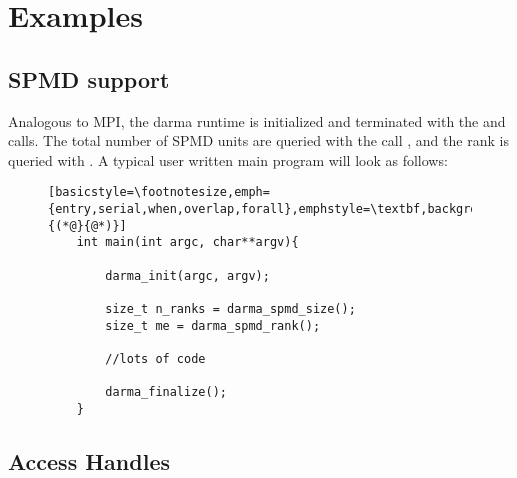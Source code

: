 \chapter{Examples}
\label{chap:examples}


\section{SPMD support}

Analogous to MPI, the darma runtime is initialized and terminated with the  
and  calls. The total number of SPMD units are queried with the call , 
and the rank is queried with . A typical user written main program will look as follows:

\begin{figure}[h!]
\begin{lstlisting}[basicstyle=\footnotesize,emph={entry,serial,when,overlap,forall},emphstyle=\textbf,backgroundcolor=\color{grayish},framexleftmargin=1em,numbers=left,numberstyle=\tiny,numbersep=5pt,escapeinside={(*@}{@*)}]
	int main(int argc, char**argv){

		darma_init(argc, argv);

		size_t n_ranks = darma_spmd_size();
		size_t me = darma_spmd_rank();

		//lots of code

		darma_finalize();
	}
\end{lstlisting}
\end{figure}


\section{Access Handles}
